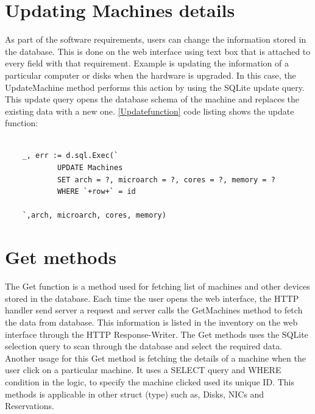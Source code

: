 \section*{Updating Machines details}
As part of the software requirements, users can change the information stored in the database. This is done on the web interface using text box that is attached to every field with that requirement. Example is updating the information of a particular computer or disks when the hardware is upgraded. In this case, the UpdateMachine method performs this action by using the SQLite update query. This update query opens the database schema of the machine and replaces the existing data with a new one.
\autoref{Updatefunction} code listing shows the update function:
\begin{lstlisting}[caption=Function for Updating data, label=Updatefunction]

	_, err := d.sql.Exec(`
			UPDATE Machines
			SET arch = ?, microarch = ?, cores = ?, memory = ?
			WHERE `+row+` = id

	`,arch, microarch, cores, memory)

\end{lstlisting}
\section{Get methods}
The Get function is a method used for fetching list of machines and other devices stored in the database. Each time the user opens the web interface, the HTTP handler send server a request and server calls the GetMachines method to fetch the data from database. This information is listed in the inventory on the web interface through the HTTP Response-Writer. The Get methods uses the SQLite selection query to scan through the database and select the required data.  Another usage for this Get method is fetching the details of a machine when the user click on a particular machine. It uses a SELECT query and WHERE condition in the logic, to specify the machine clicked used its unique ID. This methods is applicable in other struct (type) such as, Disks, NICs and Reservations. 
 
